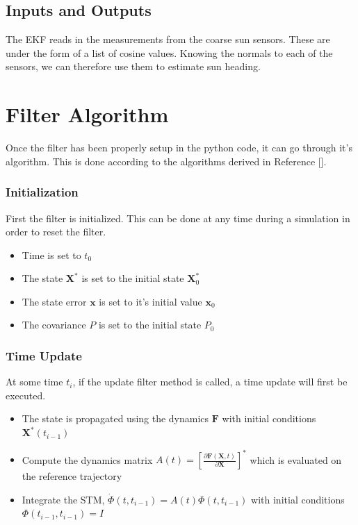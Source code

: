 \documentclass[]{BasiliskReportMemo}
\begin{document}
\subsection{Inputs and Outputs}

The EKF reads in the measurements from the coarse sun sensors. These are under the form of a list of cosine values. Knowing the normals to each of the sensors, we can therefore use them to estimate sun heading.

\section{Filter Algorithm}

Once the filter has been properly setup in the python code, it can go through it's algorithm. This is done according to the algorithms derived in Reference [].

\subsubsection*{Initialization}

First the filter is initialized. This can be done at any time during a simulation in order to reset 
the filter. 

\begin{itemize}
\item Time is set to $t_0$
\item The state $\bm X^*$ is set to the initial state  $\bm X_0^*$
\item The state error $\bm x$ is set to it's initial value $\bm x_0$
\item The covariance $P$ is set to the initial state  $P_0$
\end{itemize}


\subsubsection*{Time Update}

At some time $t_i$, if the update filter method is called, a time update will first be executed.

\begin{itemize}
\item The state is propagated using the dynamics $\bm F$ with initial conditions $\bm X^*(t_{i-1})$
\item Compute the dynamics matrix $A(t) = \left[\frac{\partial \bm F (\bm X, t)}{\partial \bm X}\right]^{*}$ which is evaluated on the reference trajectory
\item Integrate the STM, $\dot{\Phi}(t, t_{i-1}) = A(t) \Phi (t, t_{i-1})$ with initial conditions $\Phi(t_{i-1}, t_{i-1}) = I$
\end{itemize}
\end{document}
